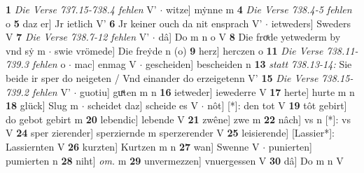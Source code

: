 \documentclass[8pt,a4paper,notitlepage]{article}
\begin{document}
\begin{table}[ht]
\begin{minipage}[t]{0.5\linewidth}
\textbf{1} \textit{Die Verse 737.15-738.4 fehlen} V'   $\cdot$ witze] mẏnne m \textbf{4} \textit{Die Verse 738.4-5 fehlen} o  \textbf{5} daz er] Jr ietlich V' \textbf{6} Jr keiner ouch da nit ensprach V'  $\cdot$ ietweders] Sweders V \textbf{7} \textit{Die Verse 738.7-12 fehlen} V'   $\cdot$ dâ] Do m n o V \textbf{8} Die froͯde yetwederm by vnd sẏ m  $\cdot$ swie vrömede] Die freẏde n (o) \textbf{9} herz] herczen o \textbf{11} \textit{Die Verse 738.11-739.3 fehlen} o   $\cdot$ mac] enmag V  $\cdot$ gescheiden] bescheiden n \textbf{13} \textit{statt 738.13-14:} Sie beide ir sper do neigeten / Vnd einander do erzeigetenn V'  \textbf{15} \textit{Die Verse 738.15-739.2 fehlen} V'   $\cdot$ guotiu] guͯten m n \textbf{16} ietweder] iewederre V \textbf{17} herte] hurte m n \textbf{18} glück] Slug m  $\cdot$ scheidet daz] scheide es V  $\cdot$ nôt] [*]: den tot V \textbf{19} tôt gebirt] do gebot gebirt m \textbf{20} lebendic] lebende V \textbf{21} zwêne] zwe m \textbf{22} nâch] vs n [*]: vs V \textbf{24} sper zierender] sperziernde m sperzerender V \textbf{25} leisierende] [Lassier*]: Lassiernten V \textbf{26} kurzten] Kurtzen m n \textbf{27} wan] Swenne V  $\cdot$ punierten] pumierten n \textbf{28} niht] \textit{om.} m \textbf{29} unvermezzen] vnuergessen V \textbf{30} dâ] Do m n V \newline
\end{minipage}
\end{table}
\newpage
\end{document}
